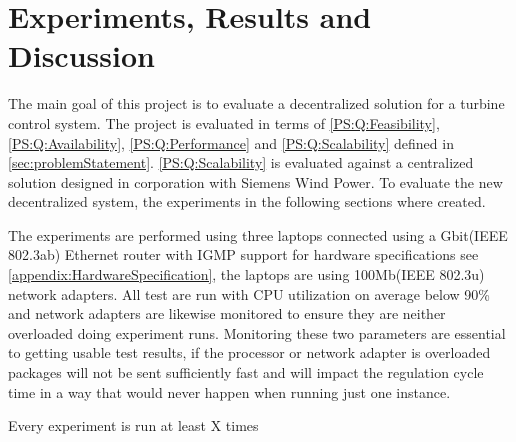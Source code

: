 
\chapter{Experiments, Results and Discussion}
\label{cha:experiments}

The main goal of this project is to evaluate a decentralized solution for a turbine control system. The project is evaluated in terms of \ref{PS:Q:Feasibility}, \ref{PS:Q:Availability}, \ref{PS:Q:Performance} and \ref{PS:Q:Scalability} defined in \cref{sec:problemStatement}. \ref{PS:Q:Scalability} is evaluated against a centralized solution designed in corporation with Siemens Wind Power.
To evaluate the new decentralized system, the experiments in the following sections where created. 

The experiments are performed using three laptops connected using a Gbit(IEEE 802.3ab) Ethernet router with IGMP support for hardware specifications see \cref{appendix:HardwareSpecification}, the laptops are using 100Mb(IEEE 802.3u) network adapters.
All test are run with CPU utilization on average below 90\% and network adapters are likewise monitored to ensure they are neither overloaded doing experiment runs. 
Monitoring these two parameters are essential to getting usable test results, if the processor or network adapter is overloaded packages will not be sent sufficiently fast and will impact the regulation cycle time in a way that would never happen when running just one instance.

Every experiment is run at least X  times 

\newcommand{\testTurbineNumbers}{2, 21, 41, 61, 81 and 101}
\newcommand{\testCycletimeNumbers}{5ms, 10ms, 15ms, 20ms, 25ms and 30ms}
\newcommand{\experiemntRunTime}{2mins}

\newcommand{\resultsPlotWidthScale}{1}
\newcommand{\resultsFigureWidthScale}{0.8}






